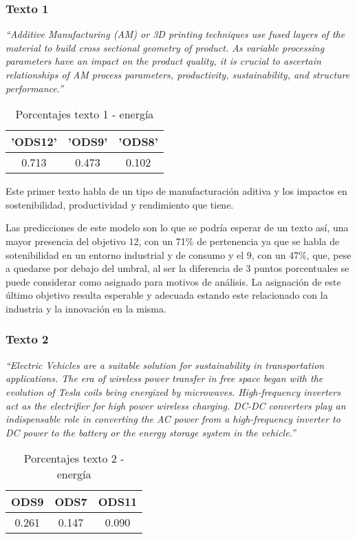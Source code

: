 \subsubsection{Texto 1}
\begin{center}
    \textit{``Additive Manufacturing (AM) or 3D printing techniques use fused
    layers of the material to build cross sectional geometry of product. As
    variable processing parameters have an impact on the product quality, it is
    crucial to ascertain relationships of AM process parameters, productivity,
    sustainability, and structure performance.''}\cite{validationtexts8}
    \begin{table}[H]
        \begin{tabular}{c | c | c }
            \hline
            'ODS12' & 'ODS9' & 'ODS8' \\ \hline
            0.713 & 0.473 & 0.102\\ \hline
        \end{tabular}
        \caption{Porcentajes texto 1 - energía}
\end{table}
\end{center}

Este primer texto habla de un tipo de manufacturación aditiva y los impactos en
sostenibilidad, productividad y rendimiento que tiene. 

Las predicciones de este modelo son lo que se podría esperar de un texto así,
una mayor presencia del objetivo 12, con un 71\% de pertenencia ya que se habla
de sotenibilidad en un entorno industrial y de consumo y el 9, con un 47\%, que,
pese a quedarse por debajo del umbral, al ser la diferencia de 3 puntos
porcentuales se puede considerar como asignado para motivos de análisis. La
asignación de este último objetivo resulta esperable y adecuada estando este
relacionado con la industria y la innovación en la misma. 


\subsubsection{Texto 2}
\begin{center}
    \textit{``Electric Vehicles are a suitable solution for sustainability in
    transportation applications. The era of wireless power transfer in free
    space began with the evolution of Tesla coils being energized by microwaves.
    High-frequency inverters act as the electrifier for high power wireless
    charging. DC-DC converters play an indispensable role in converting the AC
    power from a high-frequency inverter to DC power to the battery or the
    energy storage system in the vehicle.''}\cite{validationtexts9}
    \begin{table}[H]
        \begin{tabular}{c | c | c }
            \hline
            ODS9 & ODS7 & ODS11\\ \hline
            0.261 & 0.147 & 0.090 \\ \hline
        \end{tabular}
        \caption{Porcentajes texto 2 - energía}
\end{table}
\end{center}

